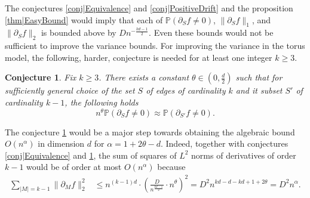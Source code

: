 \documentclass[reqno]{amsart}
\newtheorem{conjecture}{Conjecture}
\begin{document}
The conjectures \ref{conj|Equivalence} and  \ref{conj|PositiveDrift} and the proposition \ref{thm|EasyBound}  would imply that each of $\mathbb P(\partial_Sf\neq 0)$, $\|\partial_Sf\|_1$, and $\|\partial_Sf\|_2$ is bounded above by $ D n^{-\frac{kd-1}2}$. 
Even these bounds would not be sufficient to improve the variance bounds. For improving the variance in the torus model, the following, harder, conjecture is needed for at least one integer $k\geq 3$. 
\begin{conjecture}
\label{eqn|HardConjecture} 
Fix $k\geq 3$. There exists a constant $\theta\in(0,\frac d2)$ such that for sufficiently general choice of the set $S$ of edges of cardinality $k$ and it subset $S'$ of cardinality $k-1$, the following holds \[n^{\theta} \mathbb P(\partial_Sf\neq 0) \approx  \mathbb P(\partial_{S'}f\neq 0).\]
\end{conjecture}
The conjecture \ref{eqn|HardConjecture} would be a major step towards obtaining the algebraic bound $O(n^{\alpha})$ in dimension $d$ for $\alpha=1+2\theta-d$. Indeed, together with conjectures  \ref{conj|Equivalence} and  \ref{eqn|HardConjecture}, the sum of squares of $L^2$ norms of derivatives of order $k-1$ would be of order at most $O(n^{\alpha})$ because
\begin{align*}
\sum_{|M|=k-1}\|\partial_Mf\|_2^2&\leq n^{(k-1)d}\cdot \left(\frac{D}{n^{\frac{kd-1}2}}\cdot n^{\theta}\right)^2= D^2 n^{kd-d-kd+1+2\theta}=D^2n^{\alpha}.
\end{align*}
\end{document}
